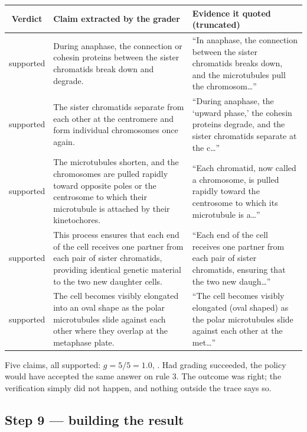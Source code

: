 \begin{center}\small
\begin{tabularx}{\textwidth}{@{}c>{\raggedright\arraybackslash}p{7.4cm}L@{}}
\toprule
\textbf{Verdict} & \textbf{Claim extracted by the grader} & \textbf{Evidence it quoted (truncated)}\\
\midrule
supported & During anaphase, the connection or cohesin proteins between the sister chromatids break down and degrade. & \enquote{In anaphase, the connection between the sister chromatids breaks down, and the microtubules pull the chromosom\ldots}\\
supported & The sister chromatids separate from each other at the centromere and form individual chromosomes once again. & \enquote{During anaphase, the \enquote{upward phase,} the cohesin proteins degrade, and the sister chromatids separate at the c\ldots}\\
supported & The microtubules shorten, and the chromosomes are pulled rapidly toward opposite poles or the centrosome to which their microtubule is attached by their kinetochores. & \enquote{Each chromatid, now called a chromosome, is pulled rapidly toward the centrosome to which its microtubule is a\ldots}\\
supported & This process ensures that each end of the cell receives one partner from each pair of sister chromatids, providing identical genetic material to the two new daughter cells. & \enquote{Each end of the cell receives one partner from each pair of sister chromatids, ensuring that the two new daugh\ldots}\\
supported & The cell becomes visibly elongated into an oval shape as the polar microtubules slide against each other where they overlap at the metaphase plate. & \enquote{The cell becomes visibly elongated (oval shaped) as the polar microtubules slide against each other at the met\ldots}\\
\bottomrule
\end{tabularx}
\end{center}

Five claims, all supported: $g = 5/5 = 1.0$, . Had grading succeeded, the policy would have accepted the same answer on rule 3. The outcome was right; the verification simply did not happen, and nothing outside the trace says so.

\subsection{Step 9 --- building the result}

